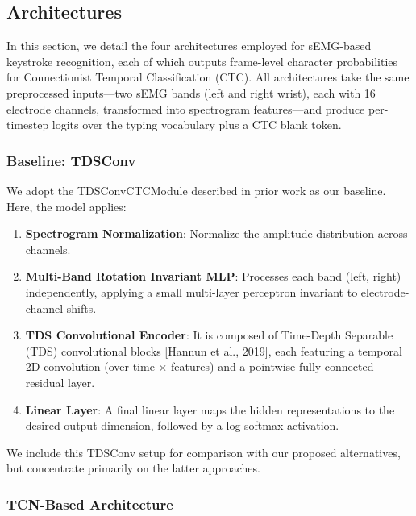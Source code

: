 \subsection{Architectures}

In this section, we detail the four architectures employed for sEMG-based keystroke recognition, each of which outputs frame-level character probabilities for Connectionist Temporal Classification (CTC). All architectures take the same preprocessed inputs—two sEMG bands (left and right wrist), each with 16 electrode channels, transformed into spectrogram features—and produce per-timestep logits over the typing vocabulary plus a CTC blank token.

\subsubsection{Baseline: TDSConv}

We adopt the TDSConvCTCModule described in prior work as our baseline. Here, the model applies:

\begin{enumerate}
    \item\textbf{Spectrogram Normalization}: Normalize the amplitude distribution across channels.

    \item\textbf{Multi-Band Rotation Invariant MLP}: Processes each band (left, right) independently, applying a small multi-layer perceptron invariant to electrode-channel shifts.

    \item\textbf{TDS Convolutional Encoder}: It is composed of Time-Depth Separable (TDS) convolutional blocks [Hannun et al., 2019], each featuring a temporal 2D convolution (over time × features) and a pointwise fully connected residual layer.
    
    \item\textbf{Linear Layer}: A final linear layer maps the hidden representations to the desired output dimension, followed by a log-softmax activation.
\end{enumerate}

We include this TDSConv setup for comparison with our proposed alternatives, but concentrate primarily on the latter approaches.

\subsubsection{TCN-Based Architecture}

